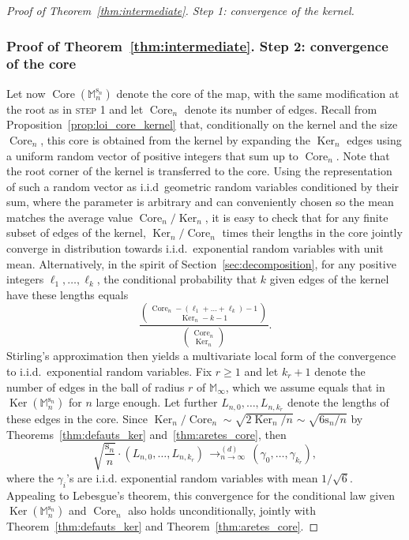 \documentclass[JEP,XML,SOM,Unicode,NoFloatCountersInSection,NoEqCountersInSection]{cedram}
\theoremstyle{plain}
\theoremstyle{definition}
\theoremstyle{remark}
\newcommand{\Mapb}{\mathbb{M}}
\newcommand{\spar}{\mathrm{s}}
\DeclareMathOperator{\Core}{Core}
\DeclareMathOperator{\Ker}{Ker}
\newcommand{\cvloi}[1][n]{\,\mathop{\longrightarrow}^{(d)}_{#1 \to \infty}\,}
\begin{document}
\begin{proof}[Proof of Theorem~\ref{thm:intermediate}. Step 1: convergence of the kernel]
\subsubsection*{Proof of Theorem~\ref{thm:intermediate}. Step 2: convergence of the core}
Let now $\Core(\Mapb_n^{\spar_n})$ denote the core of the map, with the same modification at the root as in \textsc{step 1} and let $\Core_n$ denote its number of edges.
Recall from Proposition~\ref{prop:loi_core_kernel} that, conditionally on the kernel and the size $\Core_n$, this core is obtained from the kernel by expanding the $\Ker_n$ edges using a uniform random vector of positive integers that sum up to $\Core_n$. Note that the root corner of the kernel is transferred to the core.
Using the representation of such a random vector as i.i.d~geometric random variables conditioned by their sum, where the parameter is arbitrary and can conveniently chosen so the mean matches the average value $\Core_n/\Ker_n$, it is easy to check that for any finite subset of edges of the kernel, $\Ker_n / \Core_n$ times their lengths in the core jointly converge in distribution towards i.i.d.~exponential random variables with unit mean. Alternatively, in the spirit of Section~\ref{sec:decomposition}, for any positive integers $\ell_1, \dots, \ell_k$, the conditional probability that $k$ given edges of the kernel have these lengths equals
\[
\frac{\binom{\Core_n-(\ell_1+\dots+\ell_k)-1}{\Ker_n-k-1}}{\binom{\Core_n}{\Ker_n}}.
\]
Stirling's approximation then yields a multivariate local form of the convergence to i.i.d.~exponential random variables.
Fix $r \ge 1$ and let $k_r+1$ denote the number of edges in the ball of radius $r$ of $\Mapb_\infty$, which we assume equals that in $\Ker(\Mapb_n^{\spar_n})$ for $n$ large enough. Let further $L_{n,0}, \dots, L_{n,k_r}$ denote the lengths of these edges in the core. Since $\Ker_n / \Core_n \sim \sqrt{2\Ker_n/n} \sim \sqrt{6\spar_n/n}$ by Theorems~\ref{thm:defauts_ker} and~\ref{thm:aretes_core}, then
\begin{equation}\label{eq:convergence_longueurs_core}
\sqrt{\frac{\spar_n}{n}} \cdot \left(L_{n,0}, \dots, L_{n,k_r}\right) \cvloi (\gamma_0, \dots, \gamma_{k_r}),
\end{equation}
where the $\gamma_i$'s are i.i.d. exponential random variables with mean $1/\sqrt{6}$. Appealing to \eg Lebesgue's theorem, this convergence for the conditional law given $\Ker(\Mapb_n^{\spar_n})$ and $\Core_n$ also holds unconditionally, jointly with Theorem~\ref{thm:defauts_ker} and Theorem~\ref{thm:aretes_core}.


\end{proof}
\end{document}
